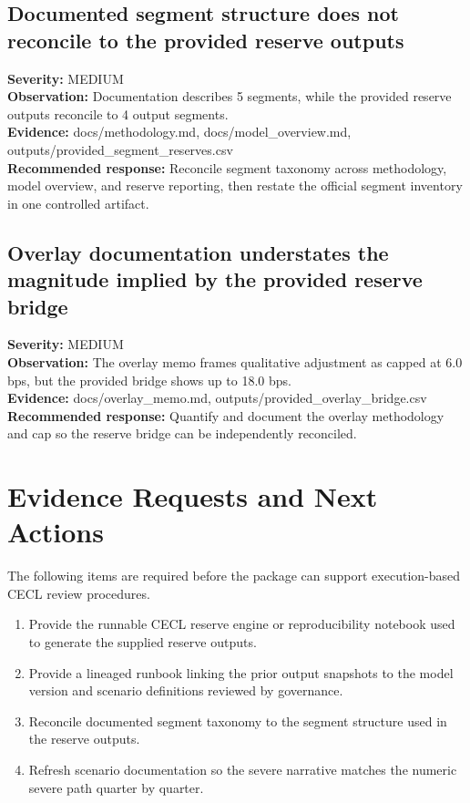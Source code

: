 \documentclass[11pt]{article}
\begin{document}
\subsection*{Documented segment structure does not reconcile to the provided reserve outputs}
\textbf{Severity:} MEDIUM\\
\textbf{Observation:} Documentation describes 5 segments, while the provided reserve outputs reconcile to 4 output segments.\\
\textbf{Evidence:} docs/methodology.md, docs/model\_overview.md, outputs/provided\_segment\_reserves.csv\\
\textbf{Recommended response:} Reconcile segment taxonomy across methodology, model overview, and reserve reporting, then restate the official segment inventory in one controlled artifact.
\subsection*{Overlay documentation understates the magnitude implied by the provided reserve bridge}
\textbf{Severity:} MEDIUM\\
\textbf{Observation:} The overlay memo frames qualitative adjustment as capped at 6.0 bps, but the provided bridge shows up to 18.0 bps.\\
\textbf{Evidence:} docs/overlay\_memo.md, outputs/provided\_overlay\_bridge.csv\\
\textbf{Recommended response:} Quantify and document the overlay methodology and cap so the reserve bridge can be independently reconciled.
\section*{Evidence Requests and Next Actions}
The following items are required before the package can support execution-based CECL review procedures.
\begin{enumerate}
\item Provide the runnable CECL reserve engine or reproducibility notebook used to generate the supplied reserve outputs.
\item Provide a lineaged runbook linking the prior output snapshots to the model version and scenario definitions reviewed by governance.
\item Reconcile documented segment taxonomy to the segment structure used in the reserve outputs.
\item Refresh scenario documentation so the severe narrative matches the numeric severe path quarter by quarter.
\end{enumerate}
\end{document}
